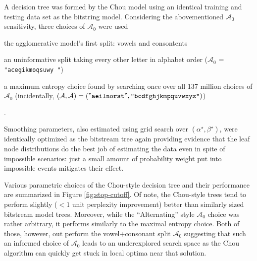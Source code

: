 \documentclass[12pt]{article}
\begin{document}
A decision tree was formed by the Chou model using an identical
training and testing data set as the bitstring model. Considering the
abovementioned $\mathcal{A}_0$ sensitivity, three choices of
$\mathcal{A}_0$ were used \begin{inparaenum} 
\item the agglomerative model's first split: vowels and consontents
\item an uninformative split taking every other letter in alphabet
  order ($\mathcal{A}_0$ = \texttt{"acegikmoqsuwy "})
\item a maximum entropy choice found by searching once over all 137
  million choices of $\mathcal{A}_0$ (incidentally, $(\mathcal{A},
  \bar{\mathcal{A}}) = (\mathtt{"aeilnorst
    "},\texttt{"bcdfghjkmpquvwxyz"})$)
\end{inparaenum}. 

Smoothing parameters, also estimated using grid search over
$(\alpha^\star, \beta^\star)$, were identically optimized as the
bitstream tree again providing evidence that the leaf node
distributions do the best job of estimating the data even in spite of
impossible scenarios: just a small amount of probability weight put
into impossible events mitigates their effect.

Various parametric choices of the Chou-style decision tree and their
performance are summarized in Figure \ref{fig:stop-cutoff}. Of note,
the Chou-style trees tend to perform slightly ($< 1$ unit perplexity
improvement) better than similarly sized bitstream model
trees. Moreover, while the ``Alternating'' style $\mathcal{A}_0$
choice was rather arbitrary, it performs similarly to the maximal
entropy choice. Both of those, however, out perform the
vowel+consonant split $\mathcal{A}_0$ suggesting that such an informed
choice of $\mathcal{A}_0$ leads to an underexplored search space as
the Chou algorithm can quickly get stuck in local optima near that
solution.
\end{document}

